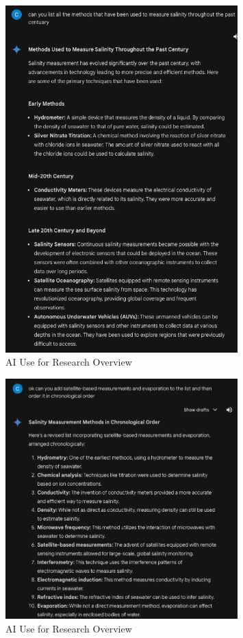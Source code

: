 \begin{figure}[!ht]
    \centering
    \includegraphics[width=0.8\textwidth]{Figures/AI_Use/research}
    \caption{AI Use for Research Overview}
\end{figure}
\begin{figure}[!ht]
    \centering
    \includegraphics[width=0.8\textwidth]{Figures/AI_Use/research1}
    \caption{AI Use for Research Overview}
\end{figure}
